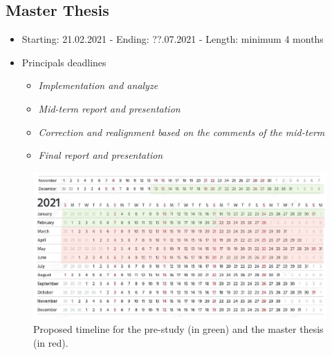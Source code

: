 \documentclass[helv,dvipsnames]{apa7}
\begin{document}
\subsection{Master Thesis}
\begin{itemize}
    \item Starting: 21.02.2021 -  Ending: ??.07.2021 - Length: minimum 4 months
    \item Principals deadlines
    \begin{itemize}
        \itemsep0mm
        \item \textit{Implementation and analyze}
        \item \textit{Mid-term report and presentation}
        \item \textit{Correction and realignment based on the comments of the mid-term}
        \item \textit{Final report and presentation}
    \end{itemize}
\end{itemize}

\begin{figure}[h]
    \centering
    \includegraphics[scale = 0.78]{Figures/timeline.pdf}
    \caption{Proposed timeline for the pre-study (in green) and the master thesis (in red).}
    \label{fig:my_label}
\end{figure}
\newpage
\printbibliography
\end{document}
